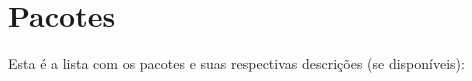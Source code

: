 \section{Pacotes}
Esta é a lista com os pacotes e suas respectivas descrições (se disponíveis)\+:\begin{DoxyCompactList}
\item{}
\end{DoxyCompactList}

